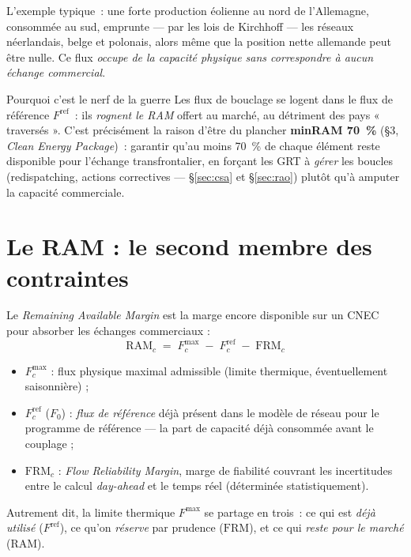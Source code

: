 \documentclass[11pt,a4paper]{article}
\newcommand{\RAM}{\mathrm{RAM}}
\newcommand{\Fmax}{F^{\max}}
\newcommand{\Fref}{F^{\mathrm{ref}}}
\newcommand{\FRM}{\mathrm{FRM}}
\begin{document}
\noindent L'exemple typique~: une forte production éolienne au nord de
l'Allemagne, consommée au sud, emprunte — par les lois de Kirchhoff — les
réseaux néerlandais, belge et polonais, alors même que la position nette
allemande peut être nulle. Ce flux \emph{occupe de la capacité physique sans
correspondre à aucun échange commercial}.

\begin{rembox}{Pourquoi c'est le nerf de la guerre}
Les flux de bouclage se logent dans le flux de référence $\Fref$~: ils
\emph{rognent le RAM} offert au marché, au détriment des pays « traversés ».
C'est précisément la raison d'être du plancher \textbf{minRAM 70~\%} (\S3,
\emph{Clean Energy Package})~: garantir qu'au moins 70~\% de chaque élément
reste disponible pour l'échange transfrontalier, en forçant les GRT à
\emph{gérer} les boucles (redispatching, actions correctives — \S\ref{sec:csa}
et \S\ref{sec:rao}) plutôt qu'à amputer la capacité commerciale.
\end{rembox}

\section{Le RAM : le second membre des contraintes}

Le \emph{Remaining Available Margin} est la marge encore disponible sur un
CNEC pour absorber les échanges commerciaux :
\[
  \boxed{\;\RAM_c \;=\; \Fmax_c \;-\; \Fref_c \;-\; \FRM_c\;}
\]
\begin{itemize}[nosep,leftmargin=1.4em]
  \item $\Fmax_c$ : flux physique maximal admissible (limite thermique,
        éventuellement saisonnière) ;
  \item $\Fref_c$ ($F_0$) : \emph{flux de référence} déjà présent dans le
        modèle de réseau pour le programme de référence — la part de
        capacité déjà consommée avant le couplage ;
  \item $\FRM_c$ : \emph{Flow Reliability Margin}, marge de fiabilité
        couvrant les incertitudes entre le calcul \emph{day-ahead} et le
        temps réel (déterminée statistiquement).
\end{itemize}

\noindent Autrement dit, la limite thermique $\Fmax$ se partage en trois~: ce
qui est \emph{déjà utilisé} ($\Fref$), ce qu'on \emph{réserve} par prudence
($\FRM$), et ce qui \emph{reste pour le marché} ($\RAM$).
\end{document}
